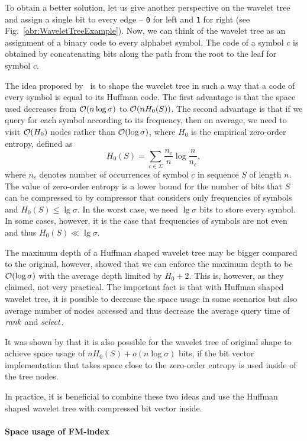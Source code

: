 To obtain a better solution, let us give another perspective on the wavelet tree and assign
a single bit to every edge -- {\tt 0} for left and {\tt 1} for right (see Fig.~\ref{obr:WaveletTreeExample}).
Now, we can think of the wavelet tree as an assignment of a binary code to every alphabet symbol.
The code of a symbol $c$ is obtained by concatenating bits along the path from the root to the leaf
for symbol $c$.

The idea proposed by~\cite{makinen2005succinct} is to shape the wavelet tree in such a way that
a code of every symbol is equal to its Huffman code. The first advantage is that the space used
decreases from $\mathcal{O}(n\log \sigma)$ to $\mathcal{O}(nH_0(S))$. The second advantage is that if
we query for each symbol according to its frequency, then on average, we need to visit
$\mathcal{O}(H_0)$ nodes rather than $\mathcal{O}(\log \sigma)$, where $H_0$ is the empirical zero-order
entropy, defined as $$H_0(S)=\sum_{c\in\Sigma} \frac{n_c}{n} \log \frac{n}{n_c},$$
where $n_c$ denotes number of occurrences of symbol $c$ in sequence $S$ of length $n$. The value
of zero-order entropy is a lower bound for the number of bits that $S$ can be compressed to by
compressor that considers only frequencies of symbols and $H_0(S)\leq \lg\sigma$. In the worst
case, we need $\lg \sigma$ bits to store every symbol. In some cases, however, it is the case
that frequencies of symbols are not even and thus $H_0(S)\ll \lg\sigma$.

The maximum depth of a Huffman shaped wavelet tree may be bigger compared to the original, however,
\cite{grabowski2004first} showed that we can enforce the maximum depth to be $\mathcal{O}(\log \sigma)$
with the average depth limited by $H_0+2$. This is, however, as they claimed, not very practical.
The important fact is that with Huffman shaped wavelet tree, it is possible to decrease the space
usage in some scenarios but also average number of nodes accessed and thus decrease the average
query time of $\mathit{rank}$ and $\mathit{select}$.

It was shown by \cite{grossi2003high} that it is also possible for the wavelet tree of original shape
to achieve space usage of $nH_0(S) + o(n\log\sigma)$ bits, if the bit vector implementation that takes
space close to the zero-order entropy is used inside of the tree nodes.

In practice, it is beneficial to combine these two ideas and use the Huffman shaped wavelet tree with
compressed bit vector inside.

\paragraph{Space usage of FM-index}

